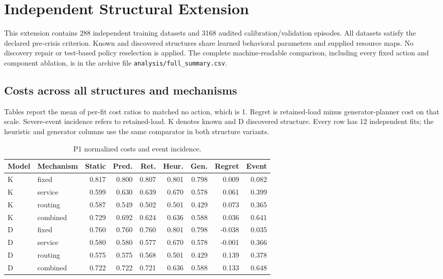 \clearpage

\section{Independent Structural Extension}

This extension contains 288 independent training datasets and 3168 audited calibration/validation episodes. All datasets satisfy the declared pre-crisis criterion. Known and discovered structures share learned behavioral parameters and supplied resource maps. No discovery repair or test-based policy reselection is applied. The complete machine-readable comparison, including every fixed action and component ablation, is in the archive file \texttt{analysis/full\_summary.csv}.

\subsection{Costs across all structures and mechanisms}

Tables report the mean of per-fit cost ratios to matched no action, which is 1. Regret is retained-load minus generator-planner cost on that scale. Severe-event incidence refers to retained-load. K denotes known and D discovered structure. Every row has 12 independent fits; the heuristic and generator columns use the same comparator in both structure variants.

\begin{table}[htbp]\caption{P1 normalized costs and event incidence.}\centering\small\setlength{\tabcolsep}{3pt}

\begin{tabular}{llrrrrrrr}\toprule

Model & Mechanism & Static & Pred. & Ret. & Heur. & Gen. & Regret & Event\\\midrule

K & fixed & 0.817 & 0.800 & 0.807 & 0.801 & 0.798 & 0.009 & 0.082\\

K & service & 0.599 & 0.630 & 0.639 & 0.670 & 0.578 & 0.061 & 0.399\\

K & routing & 0.587 & 0.549 & 0.502 & 0.501 & 0.429 & 0.073 & 0.365\\

K & combined & 0.729 & 0.692 & 0.624 & 0.636 & 0.588 & 0.036 & 0.641\\

D & fixed & 0.760 & 0.760 & 0.760 & 0.801 & 0.798 & -0.038 & 0.035\\

D & service & 0.580 & 0.580 & 0.577 & 0.670 & 0.578 & -0.001 & 0.366\\

D & routing & 0.575 & 0.575 & 0.568 & 0.501 & 0.429 & 0.139 & 0.378\\

D & combined & 0.722 & 0.722 & 0.721 & 0.636 & 0.588 & 0.133 & 0.648\\

\bottomrule\end{tabular}\end{table}

